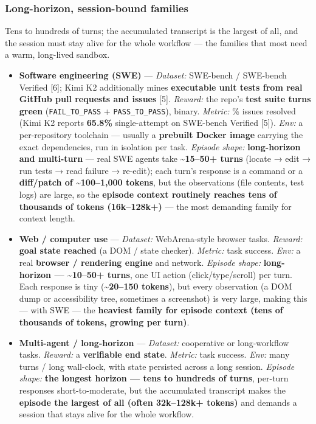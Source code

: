 \documentclass[
  paper=a4,
  ,captions=tableheading
]{scrartcl}
\providecommand{\tightlist}{%
  \setlength{\itemsep}{0pt}\setlength{\parskip}{0pt}}
\begin{document}
\hypertarget{long-horizon-session-bound-families}{%
\subsubsection{Long-horizon, session-bound
families}\label{long-horizon-session-bound-families}}

Tens to hundreds of turns; the accumulated transcript is the largest of
all, and the session must stay alive for the whole workflow --- the
families that most need a warm, long-lived sandbox.

\begin{itemize}
\tightlist
\item
  \textbf{Software engineering (SWE)} --- \emph{Dataset:} SWE-bench /
  SWE-bench Verified {[}6{]}; Kimi K2 additionally mines
  \textbf{executable unit tests from real GitHub pull requests and
  issues} {[}5{]}. \emph{Reward:} the repo's \textbf{test suite turns
  green} (\texttt{FAIL\_TO\_PASS} + \texttt{PASS\_TO\_PASS}), binary.
  \emph{Metric:} \% issues resolved (Kimi K2 reports \textbf{65.8\%}
  single-attempt on SWE-bench Verified {[}5{]}). \emph{Env:} a
  per-repository toolchain --- usually a \textbf{prebuilt Docker image}
  carrying the exact dependencies, run in isolation per task.
  \emph{Episode shape:} \textbf{long-horizon and multi-turn} --- real
  SWE agents take \textbf{\textasciitilde15--50+ turns} (locate → edit →
  run tests → read failure → re-edit); each turn's response is a command
  or a \textbf{diff/patch of \textasciitilde100--1,000 tokens}, but the
  observations (file contents, test logs) are large, so the
  \textbf{episode context routinely reaches tens of thousands of tokens
  (16k--128k+)} --- the most demanding family for context length.
\item
  \textbf{Web / computer use} --- \emph{Dataset:} WebArena-style browser
  tasks. \emph{Reward:} \textbf{goal state reached} (a DOM / state
  checker). \emph{Metric:} task success. \emph{Env:} a real
  \textbf{browser / rendering engine} and network. \emph{Episode shape:}
  \textbf{long-horizon --- \textasciitilde10--50+ turns}, one UI action
  (click/type/scroll) per turn. Each response is tiny
  (\textbf{\textasciitilde20--150 tokens}), but every observation (a DOM
  dump or accessibility tree, sometimes a screenshot) is very large,
  making this --- with SWE --- the \textbf{heaviest family for episode
  context (tens of thousands of tokens, growing per turn)}.
\item
  \textbf{Multi-agent / long-horizon} --- \emph{Dataset:} cooperative or
  long-workflow tasks. \emph{Reward:} a \textbf{verifiable end state}.
  \emph{Metric:} task success. \emph{Env:} many turns / long wall-clock,
  with state persisted across a long session. \emph{Episode shape:}
  \textbf{the longest horizon --- tens to hundreds of turns}, per-turn
  responses short-to-moderate, but the accumulated transcript makes the
  \textbf{episode the largest of all (often 32k--128k+ tokens)} and
  demands a session that stays alive for the whole workflow.
\end{itemize}
\end{document}
